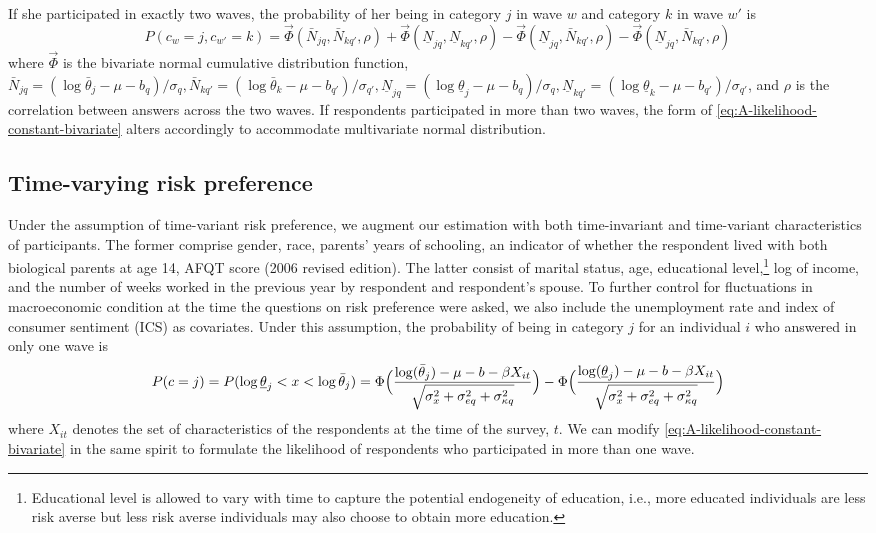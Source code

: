 \documentclass[emulatestandardclasses, 10pt, abstract = true]{scrartcl}
\begin{document}
If she participated in exactly two waves, the probability of her being in category $j$ in wave $w$ and category $k$ in wave $w'$ is
\begin{equation}
P(c_w=j, c_{w'}=k)=\vec{\Phi}(\bar N_{jq}, \bar N_{kq'},\rho)+\vec{\Phi}(\underline N_{jq}, \underline N_{kq'},\rho)-\vec{\Phi}(\underline N_{jq}, \bar N_{kq'},\rho)-\vec{\Phi}(\underline N_{jq}, \bar N_{kq'},\rho)
\label{eq:A-likelihood-constant-bivariate}
\end{equation}
where $\vec{\Phi}$ is the bivariate normal cumulative distribution function, $\bar N_{jq}=(\log \bar \theta_j-\mu-b_q)/\sigma_q,\bar N_{kq'}=(\log \bar \theta_k-\mu-b_{q'})/\sigma_{q'}, \underline N_{jq}=(\log \underline \theta_j-\mu-b_q)/\sigma_q, \underline N_{kq'}=(\log \underline \theta_k-\mu-b_{q'})/\sigma_{q'}$, and $\rho$ is the correlation between answers across the two waves. If respondents participated in more than two waves, the form of \eqref{eq:A-likelihood-constant-bivariate} alters accordingly to accommodate multivariate normal distribution.

\subsection{Time-varying risk preference}
Under the assumption of time-variant risk preference, we augment our estimation with both time-invariant and time-variant characteristics of participants. The former comprise gender, race, parents' years of schooling, an indicator of whether the respondent lived with both biological parents at age 14, AFQT score (2006 revised edition). The latter consist of marital status, age, educational level,\footnote{Educational level is allowed to vary with time to capture the potential endogeneity of education, i.e., more educated individuals are less risk averse but less risk averse individuals may also choose to obtain more education.} log of income, and the number of weeks worked in the previous year by respondent and respondent's spouse. To further control for fluctuations in macroeconomic condition at the time the questions on risk preference were asked, we also include the unemployment rate and index of consumer sentiment (ICS) as covariates. Under this assumption, the probability of being in category $j$ for an individual $i$ who answered in only one wave is
\begin{equation}
	P(c=j)=P(\log\underline{\theta}_j<x<\log\bar{\theta}_j)=\Phi\Big({\log(\bar{\theta}_j)-\mu-b-\beta X_{it}\over\sqrt{\sigma_x^2+\sigma_{eq}^2+\sigma_{\kappa q}^2}}\Big)-\Phi\Big({\log(\underline{\theta}_j)-\mu-b-\beta X_{it}\over\sqrt{\sigma_x^2+\sigma_{eq}^2+\sigma_{\kappa q}^2}}\Big) 
	\label{eq:A-likelihood-floating-univariate}	
\end{equation}
where $X_{it}$ denotes the set of characteristics of the respondents at the time of the survey, $t$. We can modify \eqref{eq:A-likelihood-constant-bivariate} in the same spirit to formulate the likelihood of respondents who participated in more than one wave. 
\end{document}
